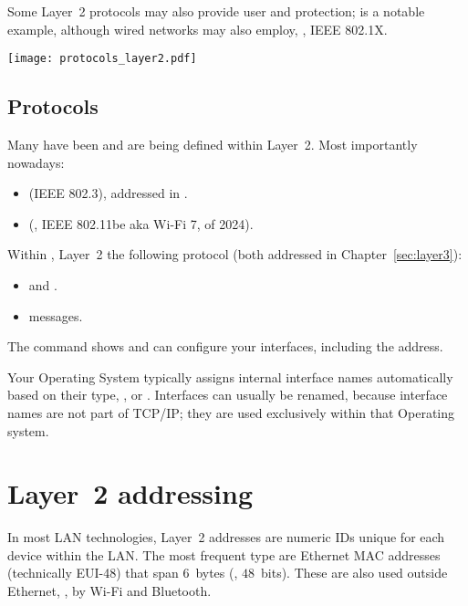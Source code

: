Some Layer~2 protocols may also provide user  and
 protection; 
 is a notable example,
although wired networks may also employ, \eg, IEEE 802.1X.

\vspace{-0.3cm}
\begin{center}
\texttt{[image: protocols\_layer2.pdf]}
\end{center}
\vspace{-0.5cm}

\subsection*{Protocols}
Many  have been and are being defined within Layer~2. Most importantly nowadays:\\[-0.65cm]
\begin{itemize}
\item {} (IEEE 802.3), addressed in .
\item {} (\eg, IEEE 802.11be aka Wi-Fi 7, of 2024).
\end{itemize}

Within , Layer~2  the following protocol 
(both addressed in Chapter~\ref{sec:layer3}):\\[-0.65cm]
\begin{itemize}
  \item {} and  .
  \item {} messages.\\[-0.75cm]
\end{itemize}

\vspace{0.5cm}

\begin{remark}
The  command shows and can configure your interfaces,
including the  address.

Your Operating System typically assigns internal interface names automatically based on their type,
\eg,  or .
% 
Interfaces can usually be renamed, because interface names 
are not part of TCP/IP; they are used exclusively within that Operating system.
\end{remark}


\section{Layer~2 addressing}
In most LAN technologies, Layer~2 addresses are numeric IDs unique for each device within the LAN. 
The most frequent type are Ethernet MAC addresses (technically EUI-48) that span $6$~bytes (\ie, $48$~bits).
These are also used outside Ethernet, \eg, by Wi-Fi and Bluetooth.

